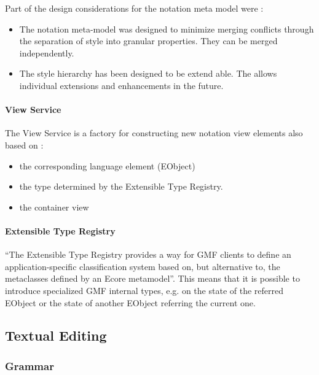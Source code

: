 Part of the design considerations for the notation meta model were \cite{GMFDoc}:
\begin{itemize}
	\item The notation meta-model was designed to minimize merging conflicts through the separation of style into granular properties. They can be merged independently.
	\item The style hierarchy has been designed to be extend able. The allows individual extensions and enhancements in the future. 
\end{itemize}

\paragraph{View Service}
The View Service is a factory for constructing new notation view elements also based on \cite{GMFDoc}:
\begin{itemize}
	\item the corresponding language element (EObject)
	\item the type determined by the Extensible Type Registry.
	\item the container view  
\end{itemize}

\paragraph{Extensible Type Registry}
``The Extensible Type Registry provides a way for GMF clients to define an application-specific classification system based on, but alternative to, the metaclasses defined by an Ecore metamodel''\cite{GMFDoc}. This means that it is possible to introduce specialized GMF internal types, e.g. on the state of the referred EObject or the state of another EObject referring the current one.










 

\subsection{Textual Editing}

\subsubsection{Grammar}
\label{cha:grammar}


